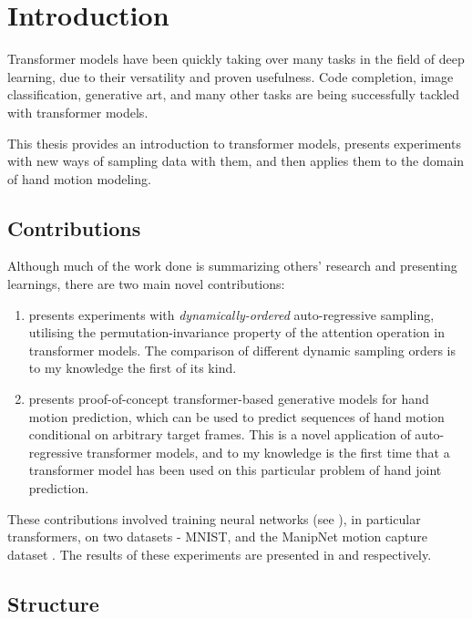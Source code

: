 \chapter{Introduction}
\label{C:intro}

Transformer models have been quickly taking over many tasks in the field of deep learning, due to their versatility and proven usefulness. Code completion, image classification, generative art, and many other tasks are being successfully tackled with transformer models.

This thesis provides an introduction to transformer models, presents experiments with new ways of sampling data with them, and then applies them to the domain of hand motion modeling.

\section{Contributions}

Although much of the work done is summarizing others' research and presenting learnings, there are two main novel contributions:
\begin{enumerate}
    \item {} presents experiments with \textit{dynamically-ordered} auto-regressive sampling, utilising the permutation-invariance property of the attention operation in transformer models. The comparison of different dynamic sampling orders is to my knowledge the first of its kind.
    \item {} presents proof-of-concept transformer-based generative models for hand motion prediction, which can be used to predict sequences of hand motion conditional on arbitrary target frames. This is a novel application of auto-regressive transformer models, and to my knowledge is the first time that a transformer model has been used on this particular problem of hand joint prediction.
\end{enumerate}
These contributions involved training neural networks (see ), in particular transformers, on two datasets - MNIST, and the ManipNet motion capture dataset \cite{manipnet}. The results of these experiments are presented in  and  respectively.

\section{Structure}

